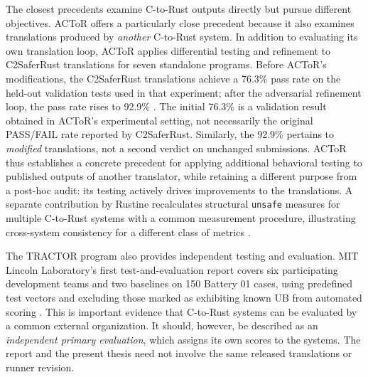 The closest precedents examine C-to-Rust outputs directly but pursue
different objectives. ACToR offers a particularly close precedent
because it also examines
translations produced by \emph{another} C-to-Rust system. In addition to
evaluating its own translation loop, ACToR applies differential testing
and refinement to C2SaferRust translations for seven standalone
programs. Before ACToR's modifications, the C2SaferRust translations
achieve a 76.3\% pass rate on the held-out validation tests used in that
experiment; after the adversarial refinement loop, the pass rate rises
to 92.9\% \cite{actor2025}. The initial 76.3\% is a validation result
obtained in ACToR's experimental setting, not necessarily the original
PASS/FAIL rate reported by C2SaferRust. Similarly, the 92.9\% pertains
to \emph{modified} translations, not a second verdict on unchanged
submissions. ACToR thus establishes a concrete precedent for applying
additional behavioral testing to published outputs of another
translator, while retaining a different purpose from a post-hoc audit:
its testing actively drives improvements to the translations. A separate
contribution by Rustine recalculates structural \texttt{unsafe} measures
for multiple C-to-Rust systems with a common measurement procedure,
illustrating cross-system consistency for a different class of metrics
\cite{dehghan2025rustine}.

The TRACTOR program also provides independent testing and evaluation.
MIT Lincoln Laboratory's first test-and-evaluation report covers six
participating development teams and two baselines on 150 Battery 01
cases, using predefined test vectors and excluding those marked as
exhibiting known UB from automated scoring
\cite{tractor-first-evaluation-report}. This is important evidence that
C-to-Rust systems can be evaluated by a common external organization. It should, however, be described as an \emph{independent primary evaluation}, which assigns its own scores to the systems. The report and the
present thesis need not involve the same released translations or runner
revision.

